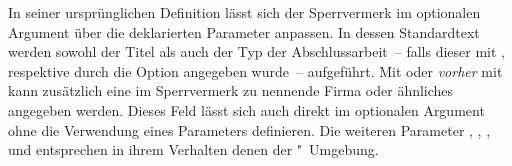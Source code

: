 \begin{DeclareEntity*}{}
\begin{DeclareEntity*}{}
\begin{DeclareEntity*}{}
\begin{Declaration}
\begin{Declaration}
\begin{Declaration}
\begin{Declaration}
\begin{Declaration}
\begin{Declaration}
\begin{Declaration}
In seiner ursprünglichen Definition lässt sich der Sperrvermerk im optionalen 
Argument über die deklarierten Parameter anpassen. In dessen Standardtext 
werden sowohl der Titel als auch der Typ der Abschlussarbeit~-- falls dieser 
mit ,  respektive 
durch die Option  angegeben wurde~-- aufgeführt. Mit 
 oder \emph{vorher} mit  kann zusätzlich 
eine im Sperrvermerk zu nennende Firma oder ähnliches angegeben werden. Dieses 
Feld lässt sich auch direkt im optionalen Argument ohne die Verwendung eines 
Parameters definieren. Die weiteren Parameter 
, , 
,  und 
 entsprechen in ihrem Verhalten denen 
der "~Umgebung.
\end{Declaration}
\end{Declaration}
\end{Declaration}
\end{Declaration}
\end{Declaration}
\end{Declaration}
\end{Declaration}


\end{DeclareEntity*}
\end{DeclareEntity*}
\end{DeclareEntity*}
